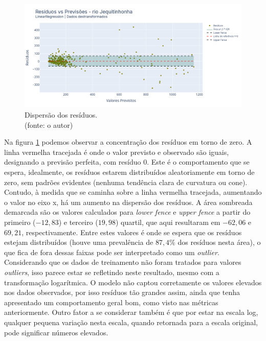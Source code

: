 \begin{figure}[!h]
	\centering
	\includegraphics[scale=0.33]{Figuras/jequiti/resultados/LR_WFV_LOG_RESID_x_PREV.png}
	\caption{Dispersão dos resíduos.\\(fonte: o autor)}
	\label{fig:jequiti_LR_WFV_LOG_RESID_x_PREV}
\end{figure}

Na figura \ref{fig:jequiti_LR_WFV_LOG_RESID_x_PREV} podemos observar a concentração dos resíduos em torno de zero. A linha vermelha tracejada é onde o valor previsto e observado são iguais, designando a previsão perfeita, com resíduo $0$. Este é o comportamento que se espera, idealmente, os resíduos estarem distribuídos aleatoriamente em torno de zero, sem padrões evidentes (nenhuma tendência clara de curvatura ou cone). Contudo, à medida que se caminha sobre a linha vermelha tracejada, aumentando o valor no eixo x, há um aumento na dispersão dos resíduos. A área sombreada demarcada são os valores calculados para \textit{lower fence} e \textit{upper fence} a partir do primeiro ($-12,83$) e terceiro ($19,98$) quartil, que aqui resultaram em $-62,06$ e $69,21$, respectivamente. Entre estes valores é onde se espera que os resíduos estejam distribuídos (houve uma prevalência de $87,4\%$ dos resíduos nesta área), o que fica de fora dessas faixas pode ser interpretado como um \textit{outlier}. Considerando que os dados de treinamento não foram tratados para valores \textit{outliers}, isso parece estar se refletindo neste resultado, mesmo com a transformação logarítmica. O modelo não captou corretamente os valores elevados nos dados observados, por isso resíduos tão grandes assim, ainda que tenha apresentado um comportamento geral bom, como visto nas métricas anteriormente. Outro fator a se considerar também é que por estar na escala log, qualquer pequena variação nesta escala, quando retornada para a escala original, pode significar números elevados.

